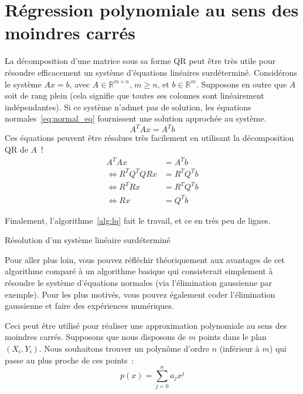 \documentclass[a4paper, 12pt]{article}
\begin{document}
\section{Régression polynomiale au sens des moindres carrés}\label{app:lq}
La décomposition d'une matrice sous sa forme QR peut être très utile pour résoudre efficacement un système d'équations linéaires surdéterminé. Considérons le système $Ax = b$, avec $A \in {\mathbb{R}}^{m \times n}$, $m \geq n$, et $b \in {\mathbb{R}}^{m}$. Supposons en outre que $A$ soit de rang plein (cela signifie que toutes ses colonnes sont linéairement indépendantes). Si ce système n'admet pas de solution, les équations normales~\ref{eq:normal_eq} fournissent une solution approchée au système.
\begin{equation}
    A^T A x = A^T b \label{eq:normal_eq}
\end{equation}
Ces équations peuvent être résolues très facilement en utilisant la décomposition QR de $A$~!
\begin{align*}
                    A^T     A   x &= A^T     b \\
    \Leftrightarrow R^T Q^T Q R x &= R^T Q^T b \\
    \Leftrightarrow R^T       R x &= R^T Q^T b \\
    \Leftrightarrow           R x &=     Q^T b
\end{align*}

\noindent Finalement, l'algorithme~\ref{alg:lq} fait le travail, et ce en très peu de lignes.

\begin{algorithm}
    \caption{Résolution d'un système linéaire surdéterminé}\label{alg:lq}
    \begin{algorithmic}[1]
    \end{algorithmic}
\end{algorithm}

Pour aller plus loin, vous pouvez réfléchir théoriquement aux avantages de cet algorithme comparé à un algorithme basique qui consisterait simplement à résoudre le système d'équations normales (via l'élimination gaussienne par exemple). Pour les plus motivés, vous pouvez également coder l'élimination gaussienne et faire des expériences numériques.

\noindent Ceci peut être utilisé pour réaliser une approximation polynomiale au sens des moindres carrés. Supposons que nous disposons de $m$ points dans le plan $(X_i, Y_i)$. Nous souhaitons trouver un polynôme d'ordre $n$ (inférieur à $m$) qui passe au plus proche de ces points~:
\begin{equation*}
    p(x) = \sum_{j=0}^{n} a_j x^j
\end{equation*}
\end{document}
